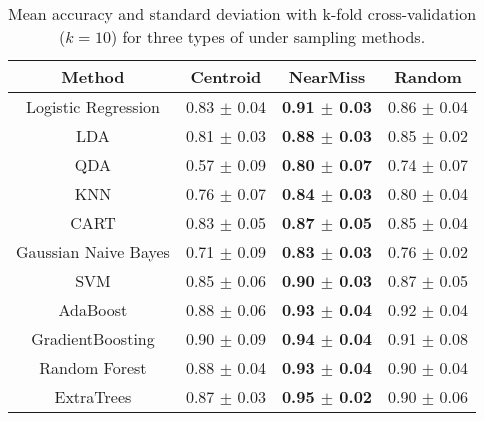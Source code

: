 \begin{table}[H] 
    \centering
    \begin{tabular}{|c|c|c|c|}
        \hline
        \textbf{Method} & \textbf{Centroid} & \textbf{NearMiss} & \textbf{Random} \\
        \hline
        Logistic Regression  & 0.83 $\pm$ 0.04 & \textbf{0.91 $\pm$ 0.03} & 0.86 $\pm$ 0.04 \\ 
        LDA                  & 0.81 $\pm$ 0.03 & \textbf{0.88 $\pm$ 0.03} & 0.85 $\pm$ 0.02 \\ 
        QDA                  & 0.57 $\pm$ 0.09 & \textbf{0.80 $\pm$ 0.07} & 0.74 $\pm$ 0.07 \\ 
        KNN                  & 0.76 $\pm$ 0.07 & \textbf{0.84 $\pm$ 0.03} & 0.80 $\pm$ 0.04 \\ 
        CART                 & 0.83 $\pm$ 0.05 & \textbf{0.87 $\pm$ 0.05} & 0.85 $\pm$ 0.04 \\ 
        Gaussian Naive Bayes & 0.71 $\pm$ 0.09 & \textbf{0.83 $\pm$ 0.03} & 0.76 $\pm$ 0.02 \\ 
        SVM                  & 0.85 $\pm$ 0.06 & \textbf{0.90 $\pm$ 0.03} & 0.87 $\pm$ 0.05 \\ 
        AdaBoost             & 0.88 $\pm$ 0.06 & \textbf{0.93 $\pm$ 0.04} & 0.92 $\pm$ 0.04 \\ 
        GradientBoosting     & 0.90 $\pm$ 0.09 & \textbf{0.94 $\pm$ 0.04} & 0.91 $\pm$ 0.08 \\ 
        Random Forest        & 0.88 $\pm$ 0.04 & \textbf{0.93 $\pm$ 0.04} & 0.90 $\pm$ 0.04 \\ 
        ExtraTrees           & 0.87 $\pm$ 0.03 & \textbf{0.95 $\pm$ 0.02} & 0.90 $\pm$ 0.06 \\ 
        \hline
    \end{tabular}
    \caption{Mean accuracy and standard deviation with k-fold cross-validation ($k = 10$) for
three types of under sampling methods.}
    \label{tab:visa_metrics}
\end{table}

\begin{minipage}{\textwidth}
  \hspace{-3.25cm}
  \begin{minipage}[H]{0.63\textwidth}
    \centering
    
    \label{fig:visa_roc_random}
  \end{minipage}
  \begin{minipage}[H]{0.63\textwidth}
    \centering
    
    \label{fig:visa_roc_random}
  \end{minipage}
\end{minipage}

